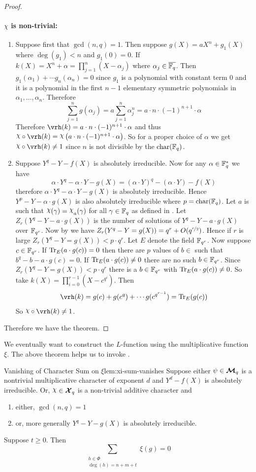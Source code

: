 \begin{proof}
  \paragraph*{$\chi$ is non-trivial:} \begin{enumerate}[label=(\roman*)]
    \item Suppose first that $\gcd(n,q)=1$. Then suppose $g(X)=aX^n+g_1(X)$ where $\deg(g_1)<n$ and $g_1(0)=0$. If $k(X)=X^n+\alpha=\prod_{j=1}^n(X-\alpha_j)$ where $\alpha_j\in\overline{\mathbb{F}_q}$. Then $g_1(\alpha_1)+\cdots g_n(\alpha_n)=0$ since $g_1$ is a polynomial with constant term $0$ and it is a polynomial in the first $n-1$ elementary symmetric polynomials in $\alpha_1,\dots, \alpha_n$. Therefore $$\sum_{j=1}^ng(\alpha_j)=a\sum_{j=1}^n\alpha_j^n=a\cdot n\cdot (-1)^{n+1}\cdot \alpha$$Therefore $\vrh(k)=a\cdot n\cdot (-1)^{n+1}\cdot \alpha$ and thus $\chi\circ\vrh(k)=\chi\lt(a\cdot n\cdot (-1)^{n+1}\cdot \alpha\rt)$. So for a proper choice of $\alpha$ we get $\chi\circ\vrh(k)\neq 1$ since $n$ is not divisible by the $\operatorname{char}(\mathbb{F}_q)$.
    \item Suppose $Y^q-Y-f(X)$ is absolutely irreducible. Now for any $\alpha\in\mathbb{F}_q^*$ we have $$\alpha\cdot Y^q-\alpha\cdot Y-g(X)=(\alpha\cdot Y)^q-(\alpha\cdot Y)-f(X)$$ therefore $\alpha\cdot Y^q-\alpha\cdot Y-g(X)$ is absolutely irreducible. Hence $Y^p-Y-\alpha\cdot g(X)$ is also absolutely irreducible where $p=\operatorname{char}(\mathbb{F}_q)$. Let $a$ is such that $\chi(\gm)=\chi_a(\gm)$ for all $\gamma\in\mathbb{F}_q$ as defined in \AddCharDefthm. Let $Z_r(Y^q-Y-a\cdot g(X))$ is the number of solutions of $Y^q-Y-a\cdot g(X)$ over $\mathbb{F}_{q^r}$. Now by \Weil we have $Z_r(Y^q-Y=g(X))=q^r+O(q^{\nicefrac{r}2})$. Hence if $r$ is large $Z_r(Y^q-Y=g(X))<p\cdot q^r$. Let $E$ denote the field $\mathbb{F}_{q^r}$. Now suppose $c\in \mathbb{F}_{q^r}$. If $\operatorname{Tr}_{E}(a\cdot g(c))=0$ then there are $p$ values of $b\in $ such that $b^q-b-a\cdot g(c)=0$. If $\operatorname{Tr}_E(a\cdot g(c))\neq 0$ there are no such $b\in\mathbb{F}_{q^r}$. Since $Z_r(Y^q-Y=g(X))<p\cdot q^r$ there is a $b\in\mathbb{F}_{q^r}$ with $\operatorname{Tr}_E(a\cdot g(c))\neq 0$. So take $k(X)=\prod_{i=0}^{r-1}(X-c^{q^i})$. Then $$\vrh(k)=g(c)+g(c^q)+\cdots g(c^{q^{r-1}})=\tr_E(g(c))$$So $\chi\circ \vrh(k)\neq 1$. 
  \end{enumerate} 
  Therefore we have the theorem. 
\end{proof}
We eventually want to construct the $L$-function using the multiplicative function $\xi$. The above theorem helps us to invoke \LFactthm. 
\begin{lemma}{Vanishing of Character Sum on $\xi$}{lem:xi-sum-vanishes}
  Suppose either $\psi\in\boldsymbol{\mathcal{M}}_q$ is a nontrivial multiplicative character of exponent $d$ and $Y^d-f(X)$ is absolutely irreducible. Or, $\chi\in\Xq$ is a non-trivial additive character and
  \begin{enumerate}[label=(\roman*)]
    \item either, $\gcd(n,q)=1$
    \item or, more generally $Y^q-Y-g(X)$ is absolutely irreducible.
  \end{enumerate}
  Suppose $t\geq 0$. Then $$\sum_{\substack{h\in \Phi\\ \deg(h)=n+m+t}}\xi(g)=0$$
\end{lemma}
